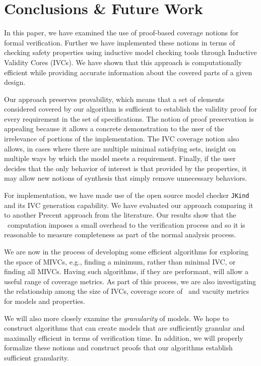 \section{Conclusions \& Future Work}
\label{sec:conclusion}

In this paper, we have examined the use of proof-based coverage notions for formal verification.
Further we have implemented these notions in terms of checking safety properties using inductive model checking tools through Inductive Validity Cores (IVCs).  We have shown that this approach
is computationally efficient while providing accurate information about the covered parts of a given design.

Our approach preserves provability, which means that a set of elements considered covered by our algorithm is sufficient to establish the validity proof for every requirement in the set of specifications.  The notion of proof preservation is appealing because it allows a concrete demonstration to the user of the irrelevance of portions of the implementation.  The IVC coverage notion also allows, in cases where there are multiple minimal satisfying sets, insight on multiple ways by which the model meets a requirement.
Finally, if the user decides that the only behavior of interest is that provided by the properties, it may allow new notions of synthesis that simply remove unnecessary behaviors.

For implementation, we have made use of the open source model checker \texttt{JKind} and its IVC generation capability. We have evaluated our approach comparing it to another Precent approach from the literature.  Our results show that the \ivccov\ computation imposes a small overhead to the verification process and so it is reasonable to measure completeness as part of the normal analysis process.

We are now in the process of developing some efficient algorithms for exploring the space of MIVCs, e.g., finding a minimum, rather than minimal IVC, or finding all MIVCs.  Having such algorithms, if they are performant, will allow a useful range of coverage metrics.  As part of this process, we are also investigating the relationship among the size of IVCs, coverage score of \ivccov\, and vacuity metrics for models and properties.

We will also more closely examine the {\em granularity} of models.  We hope to construct algorithms that can create models that are sufficiently granular and maximally efficient in terms of verification time.  In addition, we will properly formalize these notions and construct proofs that our algorithms establish sufficient granularity.

